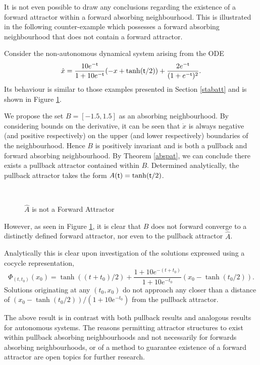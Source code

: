 It is not even possible to draw any conclusions regarding the existence of a
forward attractor within a forward absorbing neighbourhood. This is illustrated
in the following counter-example which possesses a forward absorbing
neighbourhood that does not contain a forward attractor.

\begin{eg}
Consider the non-autonomous dynamical system arising from the ODE
\[ \dot{x} = \frac{10e^{- \mathsf{\mathsf{t}}}}{1+10e^{- \mathsf{\mathsf{t}}}}( - x + \tanh( \mathsf{\mathsf{t}}/2) ) +
                \frac{2e^{- \mathsf{\mathsf{t}}}}{(1+e^{- \mathsf{\mathsf{t}}})^2}. \]
Its behaviour is similar to those examples presented in Section
\ref{stabatt} and is shown in Figure \ref{acasegfig}.

We propose the set $B = [-1.5,1.5]$ as an absorbing neighbourhood. By
considering bounds on the derivative, it can be seen that $\dot{x}$ is always
negative (and positive respectively) on the upper (and lower respectively)
boundaries of the neighbourhood. Hence $B$ is positively invariant
and is both a pullback and forward absorbing neighbourhood. By Theorem
\ref{abspat}, we can conclude there exists a pullback attractor contained
within $B$. Determined analytically, the pullback attractor takes the form
$A( \mathsf{\mathsf{t}}) = \tanh( \mathsf{\mathsf{t}}/2)$.

\begin{figure}[htb]
\begin{center}
\leavevmode
\hbox{
\epsfxsize=9.5cm
  }%
\protect\caption{$\hat{A}$ is not a Forward Attractor}
\protect\label{acasegfig} \end{center}
\end{figure}

However, as seen in Figure \ref{acasegfig}, it is clear that $B$ does not
forward converge to a distinctly defined forward attractor, nor even to the
pullback attractor $\hat{A}$.

Analytically this is clear upon investigation of the solutions expressed using
a cocycle representation,
\[ \Phi_{(t,t_0)}(x_0) = \tanh((t+t_0)/2) +\frac{1+10e^{-(t+t_0)}}
         {1+10e^{-t_0}}(x_0 - \tanh(t_0/2)). \]
Solutions originating at any $(t_0,x_0)$ do not approach any closer than a
distance of $(x_0 - \tanh(t_0/2))/(1+10e^{-t_0})$ from the pullback attractor.
\end{eg}

The above result is in contrast with both pullback results and analogous results
for autonomous systems. The reasons permitting attractor structures to exist
within pullback absorbing neighbourhoods and not necessarily for forwards
absorbing neighbourhoods, or of a method to guarantee existence of a forward
attractor are open topics for further research.

\endinput
